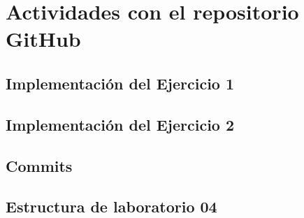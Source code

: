 \section{Actividades con el repositorio GitHub}

\subsection{Implementación del Ejercicio 1}

\subsection{Implementación del Ejercicio 2}

\subsection{Commits}

\subsection{Estructura de laboratorio 04}



  